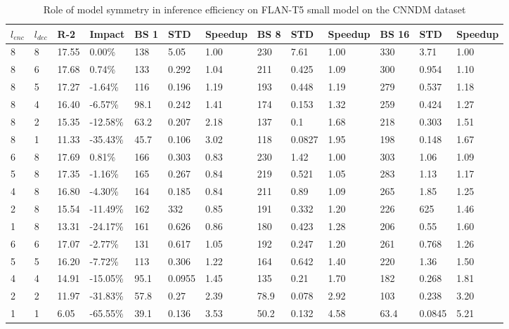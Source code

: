 \begin{table*}[!ht]
    \centering
    \caption{Role of model symmetry in inference efficiency on FLAN-T5 small model on the CNNDM dataset}
    \small
    \begin{tabular}{|l|l|l|l|l|l|l|l|l|l|l|l|l|}
    \hline
         $l_{enc}$ & $l_{dec}$ & R-2 & Impact & BS 1 & STD & Speedup & BS 8 & STD  & Speedup & BS 16 & STD & Speedup\\ \hline
         8 & 8 & 17.55 & 0.00\% & 138 & 5.05 & 1.00 & 230 & 7.61 & 1.00 & 330 & 3.71 & 1.00 \\ \hline
        8 & 6 & 17.68 & 0.74\% & 133 & 0.292 & 1.04 & 211 & 0.425 & 1.09 & 300 & 0.954 & 1.10 \\ \hline
        8 & 5 & 17.27 & -1.64\% & 116 & 0.196 & 1.19 & 193 & 0.448 & 1.19 & 279 & 0.537 & 1.18 \\ \hline
        8 & 4 & 16.40 & -6.57\% & 98.1 & 0.242 & 1.41 & 174 & 0.153 & 1.32 & 259 & 0.424 & 1.27 \\ \hline
        8 & 2 & 15.35 & -12.58\% & 63.2 & 0.207 & 2.18 & 137 & 0.1 & 1.68 & 218 & 0.303 & 1.51 \\ \hline
        8 & 1 & 11.33 & -35.43\% & 45.7 & 0.106 & 3.02 & 118 & 0.0827 & 1.95 & 198 & 0.148 & 1.67 \\ \hline
        6 & 8 & 17.69 & 0.81\% & 166 & 0.303 & 0.83 & 230 & 1.42 & 1.00 & 303 & 1.06 & 1.09 \\ \hline
        5 & 8 & 17.35 & -1.16\% & 165 & 0.267 & 0.84 & 219 & 0.521 & 1.05 & 283 & 1.13 & 1.17 \\ \hline
        4 & 8 & 16.80 & -4.30\% & 164 & 0.185 & 0.84 & 211 & 0.89 & 1.09 & 265 & 1.85 & 1.25 \\ \hline
        2 & 8 & 15.54 & -11.49\% & 162 & 332 & 0.85 & 191 & 0.332 & 1.20 & 226 & 625 & 1.46 \\ \hline
        1 & 8 & 13.31 & -24.17\% & 161 & 0.626 & 0.86 & 180 & 0.423 & 1.28 & 206 & 0.55 & 1.60 \\ \hline
        6 & 6 & 17.07 & -2.77\% & 131 & 0.617 & 1.05 & 192 & 0.247 & 1.20 & 261 & 0.768 & 1.26 \\ \hline
        5 & 5 & 16.20 & -7.72\% & 113 & 0.306 & 1.22 & 164 & 0.642 & 1.40 & 220 & 1.36 & 1.50 \\ \hline
        4 & 4 & 14.91 & -15.05\% & 95.1 & 0.0955 & 1.45 & 135 & 0.21 & 1.70 & 182 & 0.268 & 1.81 \\ \hline
        2 & 2 & 11.97 & -31.83\% & 57.8 & 0.27 & 2.39 & 78.9 & 0.078 & 2.92 & 103 & 0.238 & 3.20 \\ \hline
        1 & 1 & 6.05 & -65.55\% & 39.1 & 0.136 & 3.53 & 50.2 & 0.132 & 4.58 & 63.4 & 0.0845 & 5.21 \\ \hline
    \end{tabular}
    \label{tab:cnndm-asym-inference-small}
\end{table*}

